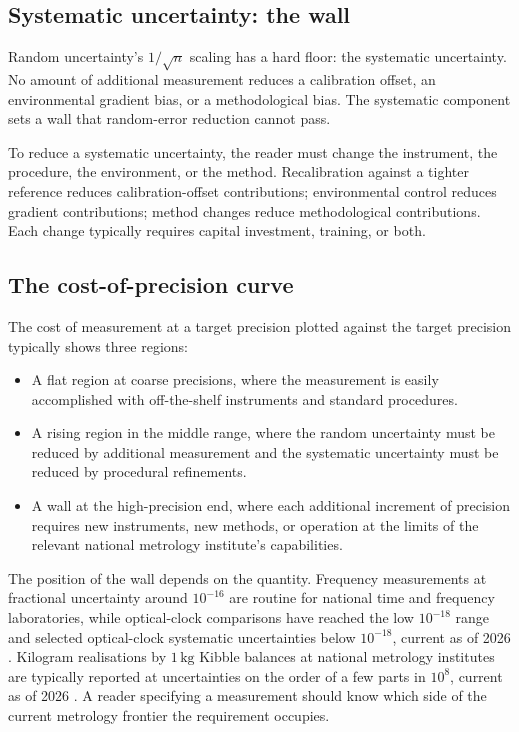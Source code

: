 \subsection{Systematic uncertainty: the wall}

Random uncertainty's $1/\sqrt{n}$ scaling has a hard floor: the
systematic uncertainty. No amount of additional measurement reduces
a calibration offset, an environmental gradient bias, or a
methodological bias. The systematic component sets a wall that
random-error reduction cannot pass.

To reduce a systematic uncertainty, the reader must change the
instrument, the procedure, the environment, or the method.
Recalibration against a tighter reference reduces calibration-offset
contributions; environmental control reduces gradient
contributions; method changes reduce methodological contributions.
Each change typically requires capital investment, training, or
both.

\subsection{The cost-of-precision curve}

The cost of measurement at a target precision plotted against the
target precision typically shows three regions:

\begin{itemize}[leftmargin=*]
  \item A flat region at coarse precisions, where the measurement
    is easily accomplished with off-the-shelf instruments and
    standard procedures.
  \item A rising region in the middle range, where the random
    uncertainty must be reduced by additional measurement and the
    systematic uncertainty must be reduced by procedural
    refinements.
  \item A wall at the high-precision end, where each additional
    increment of precision requires new instruments, new methods, or
    operation at the limits of the relevant national metrology
    institute's capabilities.
\end{itemize}

The position of the wall depends on the quantity. Frequency
measurements at fractional uncertainty around $10^{-16}$ are routine
for national time and frequency laboratories, while optical-clock
comparisons have reached the low $10^{-18}$ range and selected
optical-clock systematic uncertainties below $10^{-18}$, current as
of 2026 \cite{web:nist-optical-clock}. Kilogram realisations by
$1 \,\si{\kilogram}$ Kibble balances at national metrology institutes
are typically reported at uncertainties on the order of a few parts
in $10^{8}$, current as of 2026 \cite{web:nist-kibble-balance}. A
reader specifying a measurement should know which side of the
current metrology frontier the requirement occupies.

